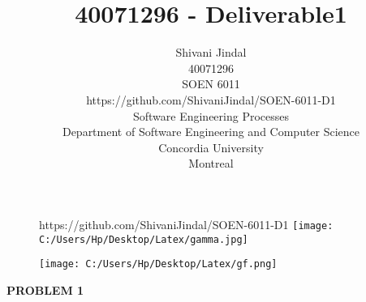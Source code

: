\documentclass[11pt]{article}
\begin{document}
\title{40071296 - Deliverable1}

\LARGE{\author{
	Shivani Jindal \\
	40071296\\
	SOEN 6011\\
	https://github.com/ShivaniJindal/SOEN-6011-D1\\
	Software Engineering Processes\\
	Department of Software Engineering and Computer Science\\
	Concordia University\\
	Montreal }}
\maketitle

\begin{figure} [h]https://github.com/ShivaniJindal/SOEN-6011-D1
	\centering
	\texttt{[image: C:/Users/Hp/Desktop/Latex/gamma.jpg]}
\end{figure}

\begin{figure}[h]
	\centering
	\texttt{[image: C:/Users/Hp/Desktop/Latex/gf.png]}
\end{figure}

\onehalfspacing

\newpage
\tableofcontents
\newpage


{\bfseries{PROBLEM 1 } }
\end{document}
